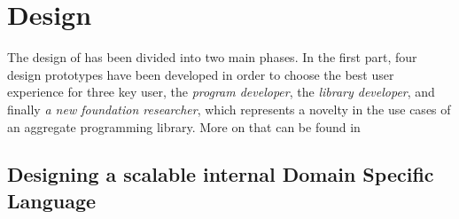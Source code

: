 \chapter{Design}
\label{chap:design}
The design of \this has been divided into two main phases.
%
In the first part, four design prototypes have been developed in order to choose the best user experience for three key user, the \textit{program developer}, the \textit{library developer}, and finally \textit{a new foundation researcher}, which represents a novelty in the use cases of an aggregate programming library.
%
More on that can be found in 

\section{Designing a scalable internal Domain Specific Language} \label{chap:design:sec:dsl}
